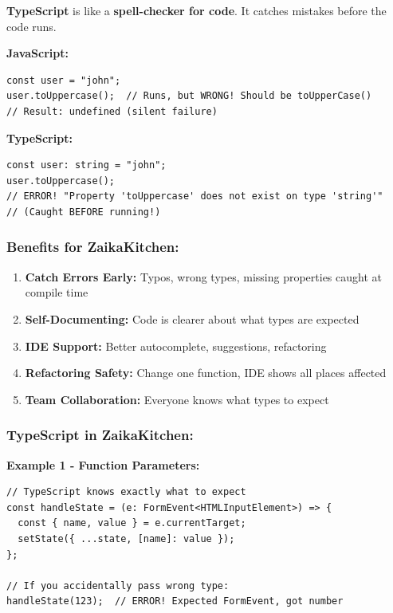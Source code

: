 \documentclass[12pt]{article}
\begin{document}
\textbf{TypeScript} is like a \textbf{spell-checker for code}. It catches mistakes before the code runs.

\textbf{JavaScript:}
\begin{lstlisting}
const user = "john";
user.toUppercase();  // Runs, but WRONG! Should be toUpperCase()
// Result: undefined (silent failure)
\end{lstlisting}

\textbf{TypeScript:}
\begin{lstlisting}
const user: string = "john";
user.toUppercase();  
// ERROR! "Property 'toUppercase' does not exist on type 'string'"
// (Caught BEFORE running!)
\end{lstlisting}

\subsubsection*{Benefits for ZaikaKitchen:}

\begin{enumerate}
    \item \textbf{Catch Errors Early:} Typos, wrong types, missing properties caught at compile time
    \item \textbf{Self-Documenting:} Code is clearer about what types are expected
    \item \textbf{IDE Support:} Better autocomplete, suggestions, refactoring
    \item \textbf{Refactoring Safety:} Change one function, IDE shows all places affected
    \item \textbf{Team Collaboration:} Everyone knows what types to expect
\end{enumerate}

\subsubsection*{TypeScript in ZaikaKitchen:}

\textbf{Example 1 - Function Parameters:}

\begin{lstlisting}
// TypeScript knows exactly what to expect
const handleState = (e: FormEvent<HTMLInputElement>) => {
  const { name, value } = e.currentTarget;
  setState({ ...state, [name]: value });
};

// If you accidentally pass wrong type:
handleState(123);  // ERROR! Expected FormEvent, got number
\end{lstlisting}
\end{document}
